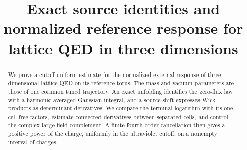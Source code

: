 \documentclass[11pt,letterpaper,reqno]{amsart}
\title[Source identities and reference response]{Exact source identities and normalized reference response for lattice QED in three dimensions}
\date{}
\begin{document}
\begin{abstract}
We prove a cutoff-uniform estimate for the normalized external response
of three-dimensional lattice QED on its reference torus. The mass and
vacuum parameters are those of one common tuned trajectory. An exact
unfolding identifies the zero-flux law with a harmonic-averaged Gaussian
integral, and a source shift expresses Wick products as determinant
derivatives. We compare the terminal logarithm with its one-cell free
factors, estimate connected derivatives between separated cells, and
control the complex large-field complement. A finite fourth-order
cancellation then gives a positive power of the charge, uniformly in
the ultraviolet cutoff, on a nonempty interval of charges.
\end{abstract}
\maketitle
\tableofcontents











\printbibliography
\end{document}
